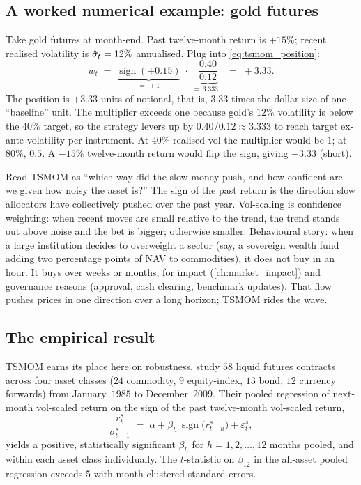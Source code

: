 \subsection{A worked numerical example: gold futures}
\label{sec:ch12_gold_example}

Take gold futures at month-end. Past twelve-month return is
$+15\%$; recent realised volatility is
$\hat{\sigma}_t = 12\%$ annualised. Plug into
\eqref{eq:tsmom_position}:
\begin{equation*}
  w_t
  \;=\;
  \underbrace{\operatorname{sign}(+0.15)}_{=\,+1}
  \;\cdot\;
  \underbrace{\frac{0.40}{0.12}}_{=\,3.333\ldots}
  \;=\;
  +3.33.
\end{equation*}
The position is $+3.33$ units of notional, that is, $3.33$ times
the dollar size of one ``baseline'' unit. The multiplier exceeds one
because gold's $12\%$ volatility is below the $40\%$ target, so
the strategy levers up by $0.40/0.12 \approx 3.333$ to reach
target ex-ante volatility per instrument. At $40\%$ realised vol
the multiplier would be $1$; at $80\%$, $0.5$. A $-15\%$
twelve-month return would flip the sign, giving $-3.33$ (short).

\begin{intuitionbox}
Read TSMOM as ``which way did the slow money push, and how
confident are we given how noisy the asset is?'' The sign of the
past return is the direction slow allocators have collectively
pushed over the past year. Vol-scaling is confidence weighting:
when recent moves are small relative to the trend, the trend
stands out above noise and the bet is bigger; otherwise smaller.
Behavioural story: when a large institution decides to overweight
a sector (say, a sovereign wealth fund adding two percentage
points of NAV to commodities), it does not buy in an hour. It
buys over weeks or months, for impact (\cref{ch:market_impact})
and governance reasons (approval, cash clearing, benchmark
updates). That flow pushes prices in one direction over a long
horizon; TSMOM rides the wave.
\end{intuitionbox}

\subsection{The empirical result}
\label{sec:ch12_empirical}

TSMOM earns its place here on robustness. \citeMOP{} study $58$
liquid futures contracts across four asset classes ($24$
commodity, $9$ equity-index, $13$ bond, $12$ currency forwards)
from January~$1985$ to December~$2009$. Their pooled regression of
next-month vol-scaled return on the sign of the past twelve-month
vol-scaled return,
\begin{equation*}
  \frac{r^s_t}{\sigma^s_{t-1}}
  \;=\; \alpha + \beta_h \,\operatorname{sign}\!\bigl(r^s_{t-h}\bigr)
  + \varepsilon^s_t,
\end{equation*}
yields a positive, statistically significant $\beta_h$ for
$h = 1, 2, \ldots, 12$ months pooled, and within each asset class
individually. The $t$-statistic on $\beta_{12}$ in the all-asset
pooled regression exceeds $5$ with month-clustered standard
errors.

